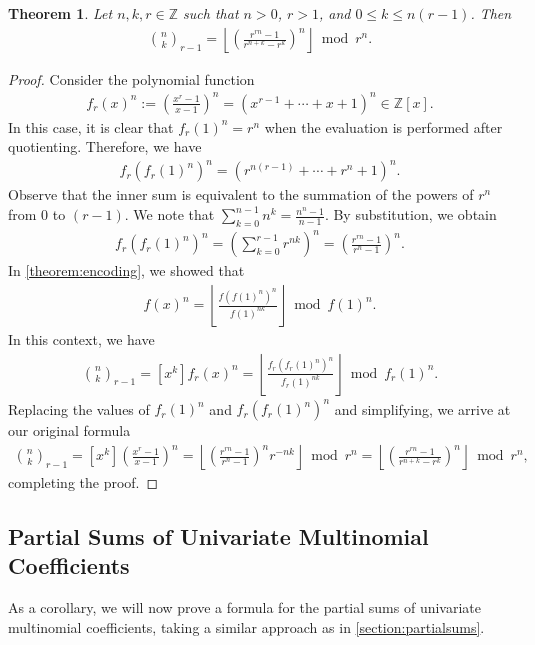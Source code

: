 \documentclass[10pt]{article}
\theoremstyle{plain}
\newtheorem{theorem}{Theorem}[section]
\newcommand{\floor}[1]{\left\lfloor #1 \right\rfloor}
\newcommand{\Z}{\mathbb{Z}}
\begin{document}
\begin{theorem}
\label{proof:multinomialformula}
Let $n,k,r \in \mathbb{Z}$ such that $n > 0$, $r>1$, and $0 \leq k \leq n (r-1)$. Then
\begin{align*}
    \binom{n}{k}_{r-1} = \floor{\left(\frac{r^{rn} - 1}{r^{n+k} - r^k}\right)^n} \bmod r^n .
\end{align*}
\end{theorem}
\begin{proof}
Consider the polynomial function
\begin{align*}
    f_r(x)^n := \left(\frac{x^{r}-1}{x-1}\right)^n = (x^{r-1} + \cdots + x + 1)^n \in \Z[x].
\end{align*}
In this case, it is clear that $f_r(1)^n = r^n$ when the evaluation is performed after quotienting. Therefore, we have
\begin{align*}
    f_r(f_r(1)^n)^n = (r^{n(r-1)} + \cdots + r^n + 1)^n .
\end{align*}
Observe that the inner sum is equivalent to the summation of the powers of $r^n$ from $0$ to $(r-1)$. We note that $\sum_{k=0}^{n-1} n^k = \frac{n^n-1}{n-1}$. By substitution, we obtain
\begin{align*}
    f_r(f_r(1)^n)^n = \left(\sum_{k=0}^{r-1} r^{nk}\right)^n = \left(\frac{r^{rn} - 1}{r^{n} - 1}\right)^n .
\end{align*}
In \cref{theorem:encoding}, we showed that
\begin{align*}
    [x^k] f(x)^{n} = \left\lfloor\frac{f(f(1)^n)^{n}}{f(1)^{n k}}\right\rfloor \bmod{f(1)^{n}} .
\end{align*}
In this context, we have
\begin{align*}
    \binom{n}{k}_{r-1} = [x^k] f_r(x)^{n} = \left\lfloor\frac{f_r(f_r(1)^n)^{n}}{f_r(1)^{n k}}\right\rfloor \bmod{f_r(1)^{n}} .
\end{align*}
Replacing the values of $f_r(1)^n$ and $f_r(f_r(1)^n)^n$ and simplifying, we arrive at our original formula
\begin{align*}
    \binom{n}{k}_{r-1} = [x^k] \left(\frac{x^{r}-1}{x-1}\right)^n
    = \left\lfloor \left(\frac{r^{rn} - 1}{r^{n} - 1}\right)^n r^{-n k}\right\rfloor \bmod r^n
    = \left\lfloor \left(\frac{r^{rn} - 1}{r^{n+k} - r^k}\right)^n\right\rfloor \bmod r^n ,
\end{align*}
completing the proof.
\end{proof}

\subsection{Partial Sums of Univariate Multinomial Coefficients}
As a corollary, we will now prove a formula for the partial sums of univariate multinomial coefficients, taking a similar approach as in \cref{section:partialsums}.
\end{document}
